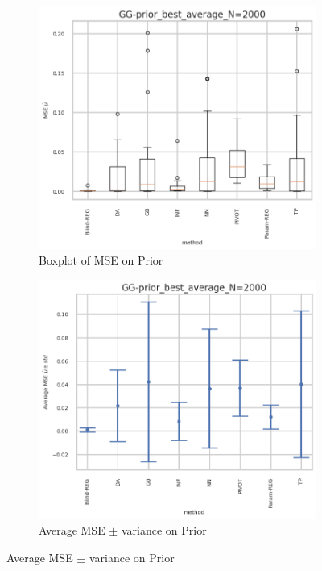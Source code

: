 \begin{figure}[ht!]
  \centering
  \begin{subfigure}[t]{0.49\linewidth}
    \includegraphics[width=\linewidth]{COMPARE/GG-prior/BEST_MSE/GG-prior_best_average_N=2000-boxplot_mse.png}
    \caption{Boxplot of MSE on Prior}
  \end{subfigure}%
  \hfill
  \begin{subfigure}[t]{0.49\linewidth}
    \includegraphics[width=\linewidth]{COMPARE/GG-prior/BEST_MSE/GG-prior_best_average_N=2000-errplot_mse.png}
    \caption{Average MSE $\pm$ variance on Prior}
  \end{subfigure}


\end{figure}
